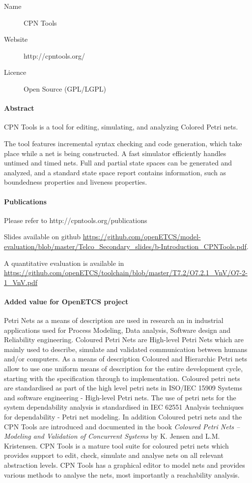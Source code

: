 \begin{description}
\item[Name] CPN Tools
\item[Website] http://cpntools.org/
\item[Licence] Open Source (GPL/LGPL)
\end{description}

\paragraph{Abstract} CPN Tools is a tool for editing, simulating, and analyzing Colored Petri nets.

The tool features incremental syntax checking and code generation, which take place while a net is being constructed. A fast simulator efficiently handles untimed and timed nets. Full and partial state spaces can be generated and analyzed, and a standard state space report contains information, such as boundedness properties and liveness properties.

\paragraph{Publications} Please refer to http://cpntools.org/publications

Slides available on github \url{https://github.com/openETCS/model-evaluation/blob/master/Telco_Secondary_slides/b-Introduction_CPNTools.pdf}.

A quantitative evaluation is available in \url{https://github.com/openETCS/toolchain/blob/master/T7.2/O7.2.1_VnV/O7-2-1_VnV.pdf}

\paragraph{Added value for OpenETCS project}

Petri Nets as a means of description are used in research an in industrial applications used for Process Modeling, Data analysis, Software design and Reliability engineering. Coloured Petri Nets are  High-level Petri Nets which are mainly used to describe, simulate and validated communication between humans and/or computers. As a means of description Coloured and  Hierarchic Petri nets allow to use one uniform means of description for the entire development cycle, starting with  the specification through to  implementation. 
Coloured petri nets are standardised as part of the high level petri nets in ISO/IEC 15909 Systems and software engineering - High-level Petri nets. The use of petri nets for the system dependability analysis is standardised in IEC 62551 Analysis techniques for dependability - Petri net modeling. In addition Coloured petri nets and the CPN Tools are introduced and documented in the book \textit{Coloured Petri Nets -- Modeling and Validation of Concurrent Systems} by K. Jensen and L.M. Kristensen. CPN Tools is a mature tool suite for coloured petri nets which provides support to edit, check, simulate and analyse nets on all relevant abstraction levels. CPN Tools has a graphical editor to model nets and provides various methods to analyse the nets, most importantly a reachability analysis. 

